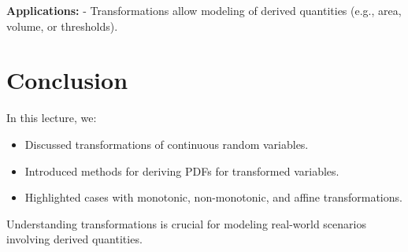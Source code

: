 \documentclass{article}
\begin{document}
\textbf{Applications:}
- Transformations allow modeling of derived quantities (e.g., area, volume, or thresholds).

\section*{Conclusion}

In this lecture, we:
\begin{itemize}
  \item Discussed transformations of continuous random variables.
  \item Introduced methods for deriving PDFs for transformed variables.
  \item Highlighted cases with monotonic, non-monotonic, and affine transformations.
\end{itemize}

Understanding transformations is crucial for modeling real-world scenarios involving derived quantities.
\end{document}

